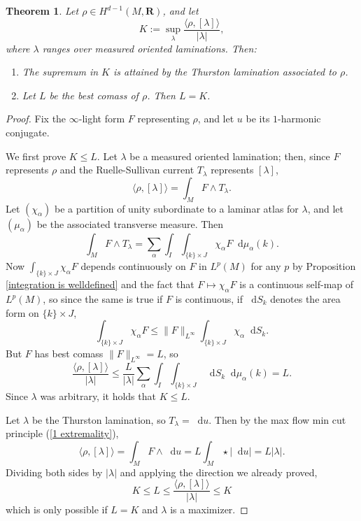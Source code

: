 \documentclass[reqno,11pt]{amsart}
\newcommand{\RR}{\mathbf{R}}
\newcommand*\dif{\mathop{}\!\mathrm{d}}
\newtheorem{theorem}{Theorem}[section]
\theoremstyle{definition}
\numberwithin{equation}{section}
\begin{document}
\begin{theorem}\label{L equals K}
	Let $\rho \in H^{d - 1}(M, \RR)$, and let 
	$$K := \sup_\lambda \frac{\langle \rho, [\lambda]\rangle}{|\lambda|},$$
	where $\lambda$ ranges over measured oriented laminations. Then:
\begin{enumerate}
	\item The supremum in $K$ is attained by the Thurston lamination associated to $\rho$.
	\item Let $L$ be the best comass of $\rho$. Then $L = K$.
\end{enumerate}
\end{theorem}
\begin{proof}
Fix the $\infty$-light form $F$ representing $\rho$, and let $u$ be its $1$-harmonic conjugate.

We first prove $K \leq L$.
Let $\lambda$ be a measured oriented lamination; then, since $F$ represents $\rho$ and the Ruelle-Sullivan current $T_\lambda$ represents $[\lambda]$,
$$\langle \rho, [\lambda]\rangle = \int_M F \wedge T_\lambda.$$
Let $(\chi_\alpha)$ be a partition of unity subordinate to a laminar atlas for $\lambda$, and let $(\mu_\alpha)$ be the associated transverse measure. Then 
$$\int_M F \wedge T_\lambda = \sum_\alpha \int_I \int_{\{k\} \times J} \chi_\alpha F \dif \mu_\alpha(k).$$
Now $\int_{\{k\} \times J} \chi_\alpha F$ depends continuously on $F$ in $L^p(M)$ for any $p$ by Proposition \ref{integration is welldefined} and the fact that $F \mapsto \chi_\alpha F$ is a continuous self-map of $L^p(M)$, so since the same is true if $F$ is continuous, if $\dif S_k$ denotes the area form on $\{k\} \times J$,
$$\int_{\{k\} \times J} \chi_\alpha F \leq \|F\|_{L^\infty} \int_{\{k\} \times J} \chi_\alpha \dif S_k.$$
But $F$ has best comass $\|F\|_{L^\infty} = L$, so 
$$\frac{\langle \rho, [\lambda] \rangle}{|\lambda|} \leq \frac{L}{|\lambda|} \sum_\alpha \int_I \int_{\{k\} \times J} \dif S_k \dif \mu_\alpha(k) = L.$$
Since $\lambda$ was arbitrary, it holds that $K \leq L$.

Let $\lambda$ be the Thurston lamination, so $T_\lambda = \dif u$.
Then by the max flow min cut principle (\ref{1 extremality}),
$$\langle \rho, [\lambda]\rangle = \int_M F \wedge \dif u = L \int_M \star |\dif u| = L|\lambda|.$$
Dividing both sides by $|\lambda|$ and applying the direction we already proved,
$$K \leq L \leq \frac{\langle \rho, [\lambda]\rangle}{|\lambda|} \leq K$$
which is only possible if $L = K$ and $\lambda$ is a maximizer.
\end{proof}
\end{document}
